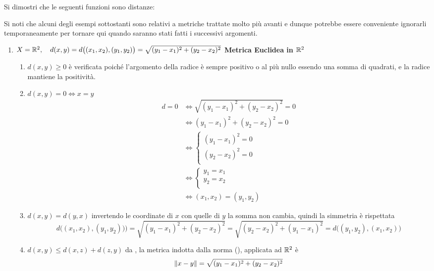 \begin{example}
	\label{ex:metriche}
	Si dimostri che le seguenti funzioni sono distanze:
	\begin{note}
		Si noti che alcuni degli esempi sottostanti sono relativi a metriche trattate molto più avanti e dunque potrebbe essere conveniente ignorarli temporaneamente per tornare qui quando saranno stati fatti i successivi argomenti.
	\end{note}
	\begin{enumerate}
		\item $X=\mathbb{R}^2,\quad d(x,y) = d\bigl((x_1,x_2),(y_1,y_2)\bigr) = \sqrt{(y_1-x_1)^2+(y_2-x_2)^2}$ \hfill {\footnotesize\textbf{Metrica Euclidea in $\mathbb{R}^2$}}\\
			\begin{enumerate}[label=\arabic*]
				\item $d(x,y) \geq 0$ è verificata poiché l'argomento della radice è sempre positivo o al più nullo essendo una somma di quadrati, e la radice mantiene la positività.
				\item $d(x,y) = 0 \iff x = y$
					\begin{align*}
						d = 0 &\iff \sqrt{(y_1-x_1)^2+(y_2-x_2)^2} = 0\\
						&\iff (y_1-x_1)^2+(y_2-x_2)^2 = 0\\
						&\iff \begin{cases}
							(y_1-x_1)^2=0\\
							(y_2-x_2)^2=0\\
						\end{cases}\\
						&\iff
						\begin{cases}
							y_1=x_1\\
							y_2=x_2\\
						\end{cases}\\
						&\iff (x_1,x_2)=(y_1,y_2)
					\end{align*}
				\item $d(x,y) = d(y,x)$ invertendo le coordinate di $x$ con quelle di $y$ la somma non cambia, quindi la simmetria è rispettata
					$$d\bigl((x_1,x_2),(y_1,y_2)\bigr) \bigr) = \sqrt{(y_1-x_1)^2+(y_2-x_2)^2} = \sqrt{(y_2-x_2)^2+(y_1-x_1)^2} = d\bigl((y_1,y_2),(x_1,x_2)\bigr)$$
				\item $d(x,y) \leq d(x,z) + d(z,y)$ da , la metrica indotta dalla norma (), applicata ad $\mathbb{R}^2$ è
					$$\left\|x - y\right\| = \sqrt{(y_1-x_1)^2+(y_2-x_2)^2}$$

\end{enumerate}
\end{enumerate}
\end{example}
